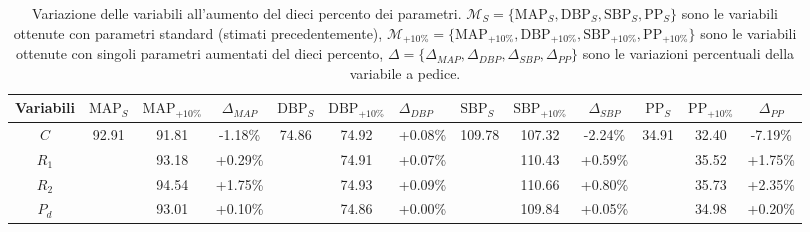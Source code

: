 \begin{landscape}
\begin{table}
\centering
\begin{tabular}{ccccccccccccc}
\hline
\textbf{Variabili} &
  \textbf{$\text{MAP}_S$} &
  \textbf{$\text{MAP}_{+10\%}$} &
  \textbf{$\Delta_{MAP}$} &
  \textbf{$\text{DBP}_S$} &
  \multicolumn{1}{l}{\textbf{$\text{DBP}_{+10\%}$}} &
  \multicolumn{1}{l}{\textbf{$\Delta_{DBP}$}} &
  \multicolumn{1}{l}{\textbf{$\text{SBP}_S$}} &
  \multicolumn{1}{l}{\textbf{$\text{SBP}_{+10\%}$}} &
  \textbf{$\Delta_{SBP}$} &
  \textbf{$\text{PP}_S$} &
  \textbf{$\text{PP}_{+10\%}$} &
  \textbf{$\Delta_{PP}$} \\ \hline
\textbf{$C$} &
  \multirow{4}{*}{92.91} &
  91.81 &
  -1.18\% &
  \multirow{4}{*}{74.86} &
  74.92 &
  +0.08\% &
  \multirow{4}{*}{109.78} &
  107.32 &
  -2.24\% &
  \multirow{4}{*}{34.91} &
  32.40 &
  -7.19\% \\
\textbf{$R_1$} &
   &
  93.18 &
  +0.29\% &
   &
  74.91 &
  +0.07\% &
   &
  110.43 &
  +0.59\% &
   &
  35.52 &
  +1.75\% \\
\textbf{$R_2$} &
   &
  94.54 &
  +1.75\% &
   &
  74.93 &
  +0.09\% &
   &
  110.66 &
  +0.80\% &
   &
  35.73 &
  +2.35\% \\
\textbf{$P_d$} &
   &
  93.01 &
  +0.10\% &
   &
  74.86 &
  +0.00\% &
   &
  109.84 &
  +0.05\% &
   &
  34.98 &
  +0.20\% \\ \hline
\end{tabular}
\caption{Variazione delle variabili all'aumento del dieci percento dei parametri. $\mathcal{M}_S=\{\text{MAP}_S, \text{DBP}_S, \text{SBP}_S, \text{PP}_S\}$ sono le variabili ottenute con parametri standard (stimati precedentemente), $\mathcal{M}_{+10\%}=\{\text{MAP}_{+10\%}, \text{DBP}_{+10\%}, \text{SBP}_{+10\%}, \text{PP}_{+10\%}\}$ sono le variabili ottenute con singoli parametri aumentati del dieci percento, $\Delta=\{\Delta_{MAP}, \Delta_{DBP}, \Delta_{SBP}, \Delta_{PP}\}$ sono le variazioni percentuali della variabile a pedice.}
\label{tab:VariazioneParametri-Variabili}
\end{table}
\end{landscape}